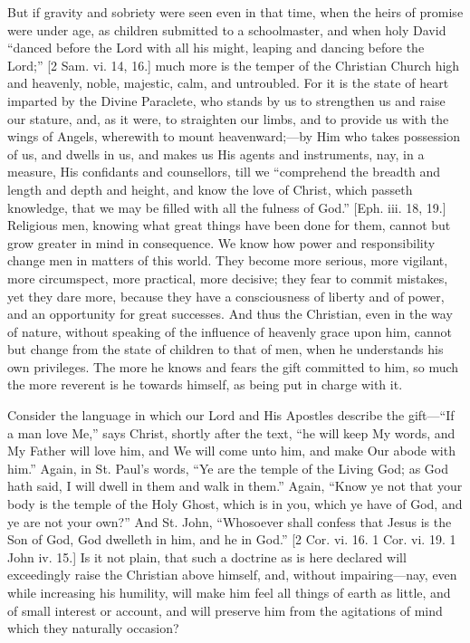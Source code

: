 But if gravity and sobriety were seen even in that time, when the
heirs of promise were under age, as children submitted to a
schoolmaster, and when holy David ``danced before the Lord with
all his might, leaping and dancing before the Lord;'' [2 Sam. vi.
14, 16.] much more is the temper of the Christian Church high and
heavenly, noble, majestic, calm, and untroubled. For it is the state
of heart imparted by the Divine Paraclete, who stands by us to
strengthen us and raise our stature, and, as it were, to straighten
our limbs, and to provide us with the wings of Angels, wherewith to
mount heavenward;—by Him who takes possession of us, and dwells in
us, and makes us His agents and instruments, nay, in a measure, His
confidants and counsellors, till we ``comprehend the breadth and
length and depth and height, and know the love of Christ, which
passeth knowledge, that we may be filled with all the fulness of
God.'' [Eph. iii. 18, 19.] Religious men, knowing what great
things have been done for them, cannot but grow greater in mind in
consequence. We know how power and responsibility change men in
matters of this world. They become more serious, more vigilant, more
circumspect, more practical, more decisive; they fear to commit
mistakes, yet they dare more, because they have a consciousness of
liberty and of power, and an opportunity for great successes. And thus
the Christian, even in the way of nature, without speaking of the
influence of heavenly grace upon him, cannot but change from the state
of children to that of men, when he understands his own privileges.
The more he knows and fears the gift committed to him, so much the
more reverent is he towards himself, as being put in charge with it.

Consider the language in which our Lord and His Apostles describe
the gift—``If a man love Me,'' says Christ, shortly after
the text, ``he will keep My words, and My Father will love him,
and We will come unto him, and make Our abode with him.'' Again,
in St. Paul's words, ``Ye are the temple of the Living God; as God
hath said, I will dwell in them and walk in them.'' Again,
``Know ye not that your body is the temple of the Holy Ghost,
which is in you, which ye have of God, and ye are not your own?''
And St. John, ``Whosoever shall confess that Jesus is the Son of
God, God dwelleth in him, and he in God.'' [2 Cor. vi. 16. 1 Cor.
vi. 19. 1 John iv. 15.] Is it not plain, that such a doctrine as is
here declared will exceedingly raise the Christian above himself, and,
without impairing—nay, even while increasing his humility, will make
him feel all things of earth as little, and of small interest or
account, and will preserve him from the agitations of mind which they
naturally occasion?

